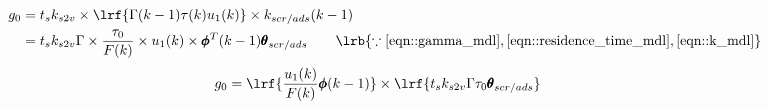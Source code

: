 \begin{align*}
        g_0 &= t_s k_{s2v} \times \lrf{\Gamma(k-1) \tau(k) u_1(k)} \times k_{scr/ads}(k-1)\\
                &= t_s k_{s2v} \Gamma \times \frac{\tau_0}{F(k)} \times u_1 (k) \times \pmb \phi^T(k-1) \pmb \theta_{scr/ads}
                \qquad \lrb{\because \ref{eqn::gamma_mdl}, \ref{eqn::residence_time_mdl}, \ref{eqn::k_mdl}}
\end{align*}
\begin{align}
        g_0 &= \lrf{ \frac{u_1(k)}{F(k)} \pmb \phi(k-1) } \times \lrf{ t_s k_{s2v} \Gamma \tau_0 \pmb \theta_{scr/ads} }
\end{align}

